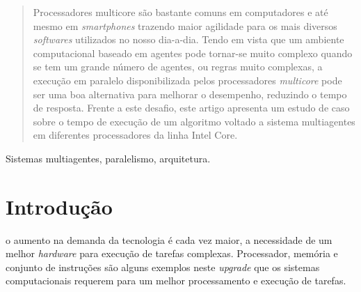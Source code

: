 \documentclass[conference]{IEEEtran}
\begin{document}
\begin{abstract}
Processadores multicore são bastante comuns em computadores e até mesmo em \textit{smartphones} trazendo maior agilidade para os mais diversos \textit{softwares} utilizados no nosso dia-a-dia. Tendo em vista que um ambiente computacional baseado em agentes pode tornar-se muito complexo quando se tem um grande número de agentes, ou regras muito complexas, a execução em paralelo disponibilizada pelos processadores \textit{multicore} pode ser uma boa alternativa para melhorar o desempenho, reduzindo o tempo de resposta. Frente a este desafio, este artigo apresenta um estudo de caso sobre o tempo de execução de um algoritmo voltado a sistema multiagentes em diferentes processadores da linha Intel Core.
\end{abstract}

\begin{IEEEkeywords}
Sistemas multiagentes, paralelismo, arquitetura.
\end{IEEEkeywords}






%
\IEEEpeerreviewmaketitle



\section{Introdução}
     o aumento na demanda da tecnologia é cada vez maior, a necessidade de um melhor \textit{hardware} para execução de tarefas complexas. Processador, memória e conjunto de instruções são alguns exemplos neste \textit{upgrade} que os sistemas computacionais requerem para um melhor processamento e execução de tarefas.
        
\end{document}
